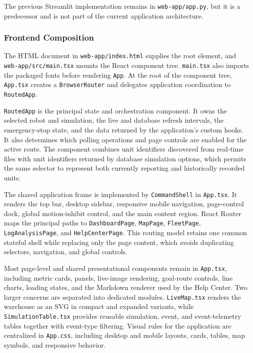 The previous Streamlit implementation remains in \texttt{web-app/app.py}, but it is a predecessor and is not part of the current application architecture.

\subsubsection{Frontend Composition}

The HTML document in \texttt{web-app/index.html} supplies the root element, and \texttt{web-app/src/main.tsx} mounts the React component tree. \texttt{main.tsx} also imports the packaged fonts before rendering \texttt{App}. At the root of the component tree, \texttt{App.tsx} creates a \texttt{BrowserRouter} and delegates application coordination to \texttt{RoutedApp}.

\texttt{RoutedApp} is the principal state and orchestration component. It owns the selected robot and simulation, the live and database refresh intervals, the emergency-stop state, and the data returned by the application's custom hooks. It also determines which polling operations and page controls are enabled for the active route. The component combines unit identifiers discovered from real-time files with unit identifiers returned by database simulation options, which permits the same selector to represent both currently reporting and historically recorded units.

The shared application frame is implemented by \texttt{CommandShell} in \texttt{App.tsx}. It renders the top bar, desktop sidebar, responsive mobile navigation, page-control dock, global motion-inhibit control, and the main content region. React Router maps the principal paths to \texttt{DashboardPage}, \texttt{MapPage}, \texttt{FleetPage}, \texttt{LogAnalysisPage}, and \texttt{HelpCenterPage}. This routing model retains one common stateful shell while replacing only the page content, which avoids duplicating selectors, navigation, and global controls.

Most page-level and shared presentational components remain in \texttt{App.tsx}, including metric cards, panels, live-image rendering, goal-route controls, line charts, loading states, and the Markdown renderer used by the Help Center. Two larger concerns are separated into dedicated modules. \texttt{LiveMap.tsx} renders the warehouse as an SVG in compact and expanded variants, while \texttt{SimulationTable.tsx} provides reusable simulation, event, and event-telemetry tables together with event-type filtering. Visual rules for the application are centralized in \texttt{App.css}, including desktop and mobile layouts, cards, tables, map symbols, and responsive behavior.

